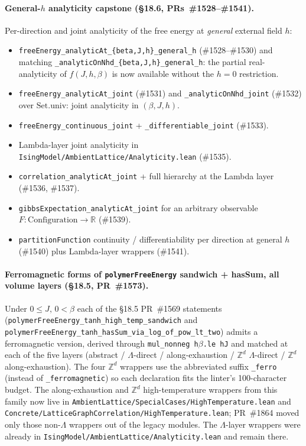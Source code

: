 \documentclass[a4paper,11pt]{article}
\begin{document}
\paragraph{General-$h$ analyticity capstone (\S18.6,
PRs~\#1528--\#1541).} Per-direction and joint analyticity of the
free energy at \emph{general} external field $h$:
\begin{itemize}
  \item \texttt{freeEnergy\_analyticAt\_\{beta,J,h\}\_general\_h}
    (\#1528--\#1530) and matching
    \texttt{\_analyticOnNhd\_\{beta,J,h\}\_general\_h}: the partial
    real-analyticity of $f(J,h,\beta)$ is now available without
    the $h = 0$ restriction.
  \item \texttt{freeEnergy\_analyticAt\_joint} (\#1531) and
    \texttt{\_analyticOnNhd\_joint} (\#1532) over $\mathrm{Set.univ}$:
    joint analyticity in $(\beta, J, h)$.
  \item \texttt{freeEnergy\_continuous\_joint} +
    \texttt{\_differentiable\_joint} (\#1533).
  \item Lambda-layer joint analyticity in
    \texttt{IsingModel/AmbientLattice/Analyticity.lean} (\#1535).
  \item \texttt{correlation\_analyticAt\_joint} +
    full hierarchy at the Lambda layer (\#1536, \#1537).
  \item \texttt{gibbsExpectation\_analyticAt\_joint} for an arbitrary
    observable $F: \mathrm{Configuration} \to \mathbb{R}$ (\#1539).
  \item \texttt{partitionFunction} continuity / differentiability per
    direction at general $h$ (\#1540) plus Lambda-layer wrappers
    (\#1541).
\end{itemize}

\paragraph{Ferromagnetic forms of \texttt{polymerFreeEnergy}
sandwich + hasSum, all volume layers (\S18.5, PR~\#1573).} Under
$0 \le J,\, 0 < \beta$ each of the §18.5 PR~\#1569 statements
(\texttt{polymerFreeEnergy\_tanh\_high\_temp\_sandwich} and
\texttt{polymerFreeEnergy\_tanh\_hasSum\_via\_log\_of\_pow\_lt\_two})
admits a ferromagnetic version, derived through
\texttt{mul\_nonneg h$\beta$.le hJ} and matched at each of the five
layers (abstract / $\Lambda$-direct / along-exhaustion /
$\mathbb{Z}^d$ $\Lambda$-direct / $\mathbb{Z}^d$ along-exhaustion).
The four $\mathbb{Z}^d$ wrappers use the abbreviated suffix
\texttt{\_ferro} (instead of \texttt{\_ferromagnetic}) so each
declaration fits the linter's 100-character budget. The along-exhaustion
and $\mathbb{Z}^d$ high-temperature wrappers from this family now live in
\texttt{AmbientLattice/SpecialCases/HighTemperature.lean} and
\texttt{Concrete/LatticeGraphCorrelation/HighTemperature.lean};
PR~\#1864 moved only those non-$\Lambda$ wrappers out of the legacy
modules. The $\Lambda$-layer wrappers were already in
\texttt{IsingModel/AmbientLattice/Analyticity.lean} and remain there.
\end{document}
